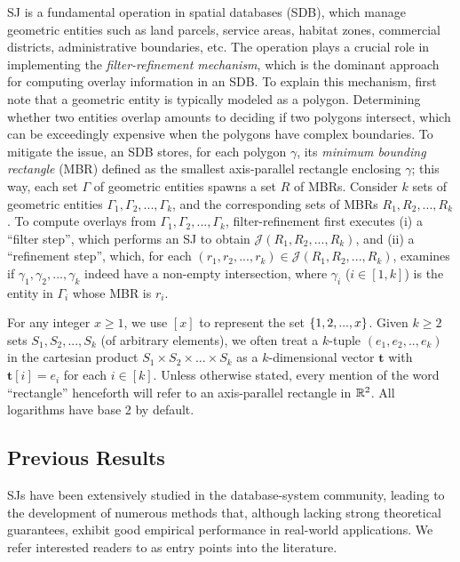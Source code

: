 \documentclass[acmsmall,review,anonymous]{acmart}
\def\vgap{\vspace{1mm}}
\def\extraspacing{\vspace{2mm} \noindent}
\def\J{\mathcal{J}}
\begin{document}
\vgap

SJ is a fundamental operation in spatial databases (SDB), which manage geometric entities such as land parcels, service areas, habitat zones, commercial districts, administrative boundaries, etc. The operation plays a crucial role in implementing the {\em filter-refinement mechanism}, which is the dominant approach for computing overlay information in an SDB. To explain this mechanism, first note that a geometric entity is typically modeled as a polygon. Determining whether two entities overlap amounts to deciding if two polygons intersect, which can be exceedingly expensive when the polygons have complex boundaries. To mitigate the issue, an SDB stores, for each polygon $\gamma$, its {\em minimum bounding rectangle} (MBR) defined as the smallest axis-parallel rectangle enclosing $\gamma$; this way, each set $\Gamma$ of geometric entities spawns a set $R$ of MBRs. Consider $k$ sets of geometric entities $\Gamma_1, \Gamma_2, ..., \Gamma_k$, and the corresponding sets of MBRs $R_1, R_2, ..., R_k$. To compute overlays from $\Gamma_1, \Gamma_2, ..., \Gamma_k$, filter-refinement first executes (i) a ``filter step'', which performs an SJ to obtain $\J(R_1, R_2, ..., R_k)$, and (ii) a ``refinement step'', which, for each $(r_1, r_2, ..., r_k) \in \J(R_1, R_2, ..., R_k)$, examines if $\gamma_1, \gamma_2, ..., \gamma_k$ indeed have a non-empty intersection, where $\gamma_i$ ($i \in [1, k]$) is the entity in $\Gamma_i$ whose MBR is $r_i$.


\extraspacing {\bf Math Conventions.} For any integer $x \ge 1$, we use $[x]$ to represent the set $\{1, 2, ..., x\}$. Given $k \ge 2$ sets $S_1, S_2, ..., S_k$ (of arbitrary elements), we often treat a $k$-tuple $(e_1, e_2, .., e_k)$ in the cartesian product $S_1 \times S_2 \times ... \times S_k$ as a $k$-dimensional vector $\bm{t}$ with $\bm{t}[i] = e_i$ for each $i \in [k]$. Unless otherwise stated, every mention of the word ``rectangle'' henceforth will refer to an axis-parallel rectangle in $\mathbb{R}^2$. All logarithms have base 2 by default.

\subsection{Previous Results} \label{sec:intro:prev}

SJs have been extensively studied in the database-system community, leading to the development of numerous methods that, although lacking strong theoretical guarantees, exhibit good empirical performance in real-world applications. We refer interested readers to \cite{apr+00,bks93,gcn+13,js07,ks97,lr94,lr96,mp98,mp01,mp03,pd96,pmt99} as entry points into the literature.
\end{document}
